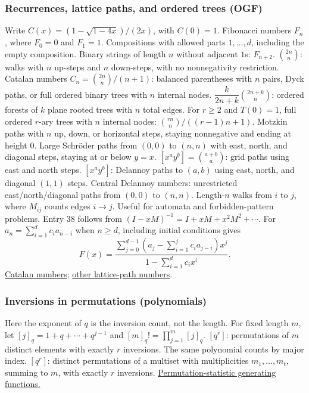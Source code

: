 \subsubsection*{Recurrences, lattice paths, and ordered trees (OGF)}
Write $C(x)=(1-\sqrt{1-4x})/(2x)$, with $C(0)=1$.
  {Fibonacci numbers $F_n$, where $F_0=0$ and $F_1=1$.}
  {Compositions with allowed parts $1,\ldots,d$, including the empty composition.}
  {Binary strings of length $n$ without adjacent $1$s: $F_{n+2}$.}
  {$\binom{2n}{n}$: walks with $n$ up-steps and $n$ down-steps, with no nonnegativity restriction.}
  {Catalan numbers $C_n=\binom{2n}{n}/(n+1)$: balanced parentheses with $n$ pairs, Dyck paths, or full ordered binary trees with $n$ internal nodes.}
  {$\dfrac{k}{2n+k}\binom{2n+k}{n}$: ordered forests of $k$ plane rooted trees with $n$ total edges.}
  {For $r\ge2$ and $T(0)=1$, full ordered $r$-ary trees with $n$ internal nodes: $\binom{rn}{n}/((r-1)n+1)$.}
  {Motzkin paths with $n$ up, down, or horizontal steps, staying nonnegative and ending at height $0$.}
  {Large Schr\"oder paths from $(0,0)$ to $(n,n)$ with east, north, and diagonal steps, staying at or below $y=x$.}
  {$[x^ay^b]=\binom{a+b}{a}$: grid paths using east and north steps.}
  {$[x^ay^b]$: Delannoy paths to $(a,b)$ using east, north, and diagonal $(1,1)$ steps.}
  {Central Delannoy numbers: unrestricted east/north/diagonal paths from $(0,0)$ to $(n,n)$.}
  {Length-$n$ walks from $i$ to $j$, where $M_{ij}$ counts edges $i\to j$. Useful for automata and forbidden-pattern problems.}
Entry 38 follows from $(I-xM)^{-1}=I+xM+x^2M^2+\cdots$.
For $a_n=\sum_{i=1}^d c_i a_{n-i}$ when $n\ge d$, including initial conditions gives
\[
  F(x)=\frac{
    \displaystyle\sum_{j=0}^{d-1}
      \left(a_j-\sum_{i=1}^{j}c_i a_{j-i}\right)x^j
  }{1-\displaystyle\sum_{i=1}^d c_ix^i}.
\]
\href{https://dlmf.nist.gov/26.5}{Catalan numbers};
\href{https://dlmf.nist.gov/26.6}{other lattice-path numbers}.

\subsubsection*{Inversions in permutations (polynomials)}
Here the exponent of $q$ is the inversion count, not the length.
For fixed length $m$, let $[j]_q=1+q+\cdots+q^{j-1}$ and
$[m]_q!=\prod_{j=1}^m[j]_q$.
  {$[q^r]$: permutations of $m$ distinct elements with exactly $r$ inversions. The same polynomial counts by major index.}
  {$[q^r]$: distinct permutations of a multiset with multiplicities $m_1,\ldots,m_t$, summing to $m$, with exactly $r$ inversions.}
\href{https://dlmf.nist.gov/26.14}{Permutation-statistic generating functions.}

